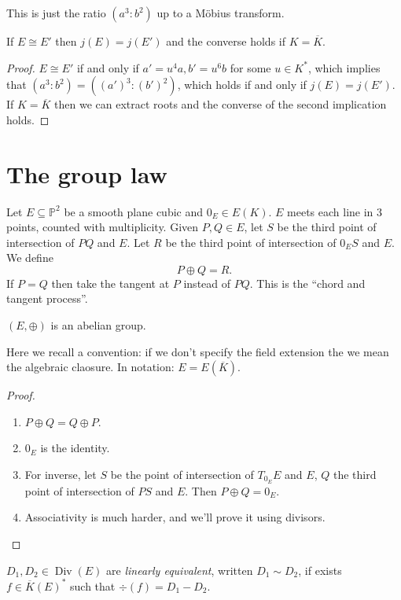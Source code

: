 \documentclass[a4paper]{article}
\theoremstyle{definition}
\renewcommand*{\P}{\mathbb{P}}
\DeclareMathOperator{\Div}{Div} %
\begin{document}
This is just the ratio \((a^3 : b^2)\) up to a Möbius transform.

\begin{corollary}
  If \(E \cong E'\) then \(j(E) = j(E')\) and the converse holds if \(K = \overline K\).
\end{corollary}

\begin{proof}
  \(E \cong E'\) if and only if \(a' = u^4 a, b' = u^6 b\) for some \(u \in K^*\), which implies that \((a^3: b^2) = ((a')^3 : (b')^2)\), which holds if and only if \(j(E) = j(E')\). If \(K = \overline K\) then we can extract roots and the converse of the second implication holds.
\end{proof}

\section{The group law}

Let \(E \subseteq \P^2\) be a smooth plane cubic and \(0_E \in E(K)\). \(E\) meets each line in 3 points, counted with multiplicity. Given \(P, Q \in E\), let \(S\) be the third point of intersection of \(PQ\) and \(E\). Let \(R\) be the third point of intersection of \(0_ES\) and \(E\). We define
\[
  P \oplus Q = R.
\]
If \(P = Q\) then take the tangent at \(P\) instead of \(PQ\). This is the ``chord and tangent process''.

\begin{theorem}
  \((E, \oplus)\) is an abelian group.
\end{theorem}

Here we recall a convention: if we don't specify the field extension the we mean the algebraic claosure. In notation: \(E = E(\overline K)\).

\begin{proof}\leavevmode
  \begin{enumerate}
  \item \(P \oplus Q = Q \oplus P\).
  \item \(0_E\) is the identity.
  \item For inverse, let \(S\) be the point of intersection of \(T_{0_E}E\) and \(E\), \(Q\) the third point of intersection of \(PS\) and \(E\). Then \(P \oplus Q = 0_E\).
  \item Associativity is much harder, and we'll prove it using divisors.
  \end{enumerate}
\end{proof}

\begin{definition}
  \(D_1, D_2 \in \Div(E)\) are \emph{linearly equivalent}, written \(D_1 \sim D_2\), if exists \(f \in \overline K(E)^*\) such that \(\div (f) = D_1 - D_2\).
\end{definition}
\end{document}
